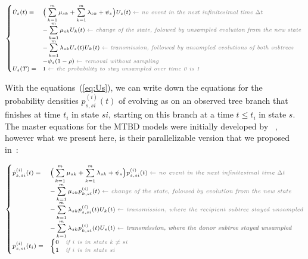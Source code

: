 \documentclass[a4paper,10pt]{article}
\begin{document}
\begin{equation}
\scriptsize
\begin{cases}
\dot{U}_{s}(t) = &\Big(\sum\limits_{k=1}^{m} \mu_{sk} + \sum\limits_{k=1}^{m} \lambda_{sk} + \psi_s\Big) U_{s}(t)\; \textit{\color{gray} $\leftarrow$ no event in the next infinitesimal time $\Delta t$ }\\ 
    & - \sum\limits_{k=1}^{m} \mu_{sk} U_{k}(t)\;  \textit{\color{gray} $\leftarrow$ change of the state, folowed by unsampled evolution from the new state }\\
    &- \sum\limits_{k=1}^{m} \lambda_{sk} U_{s}(t)U_{k}(t) \;  \textit{\color{gray} $\leftarrow$ transmission, followed by unsampled evolutions of both subtrees}\\
    &- \psi_s (1 - \rho)\;  \textit{\color{gray} $\leftarrow$ removal without sampling}\\
U_{s}(T) = & 1\;  \textit{\color{gray} $\leftarrow$ the probability to stay unsampled over time 0 is 1} \label{eq:Us}
\end{cases}
\end{equation}


With the equations~(\ref{eq:Us}), we can write down the equations for the probability densities $p_{s,si}^{(i)}(t)$ of evolving as on an observed tree branch that finishes at time $t_i$ in state $si$, starting  on this branch at a time $t \leq t_i$ in state $s$. The master equations for the MTBD models were initially developed by ~\citet{Stadler2013a}, however what we present here, is their parallelizable version that we proposed in~\cite{zhukovaFastAccurateMaximumLikelihood2022}:

\begin{equation}
\scriptsize
\begin{cases}
\dot{p}_{s,si}^{(i)}(t) = & \Big(\sum\limits_{k=1}^{m} \mu_{sk} + \sum\limits_{k=1}^{m} \lambda_{sk} + \psi_s\Big) p_{s,si}^{(i)}(t)\; \textit{\color{gray} $\leftarrow$ no event in the next infinitesimal time $\Delta t$ }\\
    & - \sum\limits_{k=1}^{m} \mu_{sk} p_{k,si}^{(i)}(t)\;  \textit{\color{gray} $\leftarrow$ change of the state, folowed by evolution from the new state }\\
    & - \sum\limits_{k=1}^{m} \lambda_{sk} p_{s,si}^{(i)}(t)U_{k}(t)\;  \textit{\color{gray} $\leftarrow$ transmission, where the recipient subtree stayed unsampled}\\
    & - \sum\limits_{k=1}^{m} \lambda_{sk} p_{k,si}^{(i)}(t)U_{s}(t)\;  \textbf{\textit{\color{gray} $\leftarrow$ transmission, where the donor subtree stayed unsampled}}\\
p_{s,si}^{(i)}(t_i) = & 
    \begin{cases}
    0 & \textit{\color{gray} if $i$ is in state $k \neq si$}\\
    1 & \textit{\color{gray} if $i$ is in state $si$}
    \end{cases}\label{eq:p}
\end{cases}
\end{equation}
\end{document}
